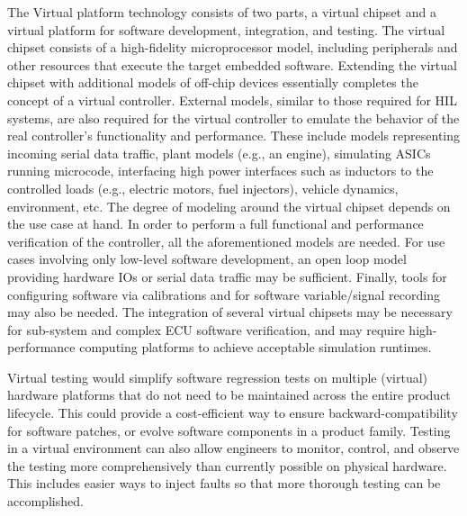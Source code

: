 The Virtual platform technology consists of two parts, a virtual chipset and a virtual platform for software development, integration, and testing.
The virtual chipset consists of a high-fidelity microprocessor model, including peripherals and other resources that execute the target embedded software.
Extending the virtual chipset with additional models of off-chip devices essentially completes the concept of a virtual controller.
External models, similar to those required for HIL systems, are also required for the virtual controller to emulate the behavior of the real controller's functionality and performance.
These include models representing incoming serial data traffic, plant models (e.g., an engine), simulating ASICs running microcode, interfacing high power interfaces such as inductors to the controlled loads (e.g., electric motors, fuel injectors), vehicle dynamics, environment, etc.
The degree of modeling around the virtual chipset depends on the use case at hand.
In order to perform a full functional and performance verification of the controller, all the aforementioned models are needed.
For use cases involving only low-level software development, an open loop model providing hardware IOs or serial data traffic may be sufficient.
Finally, tools for configuring software via calibrations and for software variable/signal recording may also be needed.
The integration of several virtual chipsets may be necessary for sub-system and complex ECU software verification, and may require high-performance computing platforms to achieve acceptable simulation runtimes.

Virtual testing would simplify software regression tests on multiple (virtual) hardware platforms that do not need to be maintained across the entire product lifecycle.
This could provide a cost-efficient way to ensure backward-compatibility for software patches, or evolve software components in a product family.
%
Testing in a virtual environment can also allow engineers to monitor, control, and observe the testing more comprehensively than currently possible on physical hardware.
This includes easier ways to inject faults so that more thorough testing can be accomplished.
